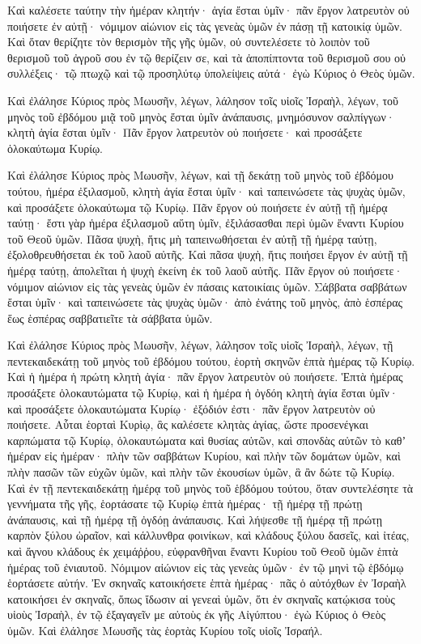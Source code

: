 {Καὶ καλέσετε ταύτην τὴν ἡμέραν κλητήν· ἁγία ἔσται ὑμῖν· πᾶν ἔργον λατρευτὸν οὐ ποιήσετε ἐν αὐτῇ· νόμιμον αἰώνιον εἰς τὰς γενεὰς ὑμῶν ἐν πάσῃ τῇ κατοικίᾳ ὑμῶν.
Καὶ ὅταν θερίζητε τὸν θερισμὸν τῆς γῆς ὑμῶν, οὐ συντελέσετε τὸ λοιπὸν τοῦ θερισμοῦ τοῦ ἀγροῦ σου ἐν τῷ θερίζειν σε, καὶ τὰ ἀποπίπτοντα τοῦ θερισμοῦ σου οὐ συλλέξεις· τῷ πτωχῷ καὶ τῷ προσηλύτῳ ὑπολείψεις αὐτά· ἐγὼ Κύριος ὁ Θεὸς ὑμῶν.
\par }{\PP {}Καὶ ἐλάλησε Κύριος πρὸς Μωυσῆν, λέγων,
λάλησον τοῖς υἱοῖς Ἰσραὴλ, λέγων, τοῦ μηνὸς τοῦ ἐβδόμου μιᾷ τοῦ μηνὸς ἔσται ὑμῖν ἀνάπαυσις, μνημόσυνον σαλπίγγων· κλητὴ ἁγία ἔσται ὑμῖν·
Πᾶν ἔργον λατρευτὸν οὐ ποιήσετε· καὶ προσάξετε ὁλοκαύτωμα Κυρίῳ.
\par }{\PP {}Καὶ ἐλάλησε Κύριος πρὸς Μωυσῆν, λέγων,
καὶ τῇ δεκάτῃ τοῦ μηνὸς τοῦ ἐβδόμου τούτου, ἡμέρα ἐξιλασμοῦ, κλητὴ ἁγία ἔσται ὑμῖν· καὶ ταπεινώσετε τὰς ψυχὰς ὑμῶν, καὶ προσάξετε ὁλοκαύτωμα τῷ Κυρίῳ.
Πᾶν ἔργον οὐ ποιήσετε ἐν αὐτῇ τῇ ἡμέρᾳ ταύτῃ· ἔστι γὰρ ἡμέρα ἐξιλασμοῦ αὕτη ὑμῖν, ἐξιλάσασθαι περὶ ὑμῶν ἔναντι Κυρίου τοῦ Θεοῦ ὑμῶν.
Πᾶσα ψυχὴ, ἥτις μὴ ταπεινωθήσεται ἐν αὐτῇ τῇ ἡμέρᾳ ταύτῃ, ἐξολοθρευθήσεται ἐκ τοῦ λαοῦ αὐτῆς.
Καὶ πᾶσα ψυχὴ, ἥτις ποιήσει ἔργον ἐν αὐτῇ τῇ ἡμέρᾳ ταύτῃ, ἀπολεῖται ἡ ψυχὴ ἐκείνη ἐκ τοῦ λαοῦ αὐτῆς.
Πᾶν ἔργον οὐ ποιήσετε· νόμιμον αἰώνιον εἰς τὰς γενεὰς ὑμῶν ἐν πάσαις κατοικίαις ὑμῶν.
Σάββατα σαββάτων ἔσται ὑμῖν· καὶ ταπεινώσετε τὰς ψυχὰς ὑμῶν· ἀπὸ ἐνάτης τοῦ μηνὸς, ἀπὸ ἑσπέρας ἕως ἑσπέρας σαββατιεῖτε τὰ σάββατα ὑμῶν.
\par }{\PP {}Καὶ ἐλάλησε Κύριος πρὸς Μωυσῆν, λέγων,
λάλησον τοῖς υἱοῖς Ἰσραὴλ, λέγων, τῇ πεντεκαιδεκάτῃ τοῦ μηνὸς τοῦ ἐβδόμου τούτου, ἑορτὴ σκηνῶν ἑπτὰ ἡμέρας τῷ Κυρίῳ.
Καὶ ἡ ἡμέρα ἡ πρώτη κλητὴ ἁγία· πᾶν ἔργον λατρευτὸν οὐ ποιήσετε.
Ἑπτὰ ἡμέρας προσάξετε ὁλοκαυτώματα τῷ Κυρίῳ, καὶ ἡ ἡμέρα ἡ ὀγδόη κλητὴ ἁγία ἔσται ὑμῖν· καὶ προσάξετε ὁλοκαυτώματα Κυρίῳ· ἐξόδιόν ἐστι· πᾶν ἔργον λατρευτὸν οὐ ποιήσετε.
Αὗται ἑορταὶ Κυρὶῳ, ἃς καλέσετε κλητὰς ἁγίας, ὥστε προσενέγκαι καρπώματα τῷ Κυρίῳ, ὁλοκαυτώματα καὶ θυσίας αὐτῶν, καὶ σπονδὰς αὐτῶν τὸ καθʼ ἡμέραν εἰς ἡμέραν·
πλὴν τῶν σαββάτων Κυρίου, καὶ πλὴν τῶν δομάτων ὑμῶν, καὶ πλὴν πασῶν τῶν εὐχῶν ὑμῶν, καὶ πλὴν τῶν ἐκουσίων ὑμῶν, ἃ ἂν δώτε τῷ Κυρίῳ.
Καὶ ἐν τῇ πεντεκαιδεκάτῃ ἡμέρᾳ τοῦ μηνὸς τοῦ ἑβδόμου τούτου, ὅταν συντελέσητε τὰ γεννήματα τῆς γῆς, ἑορτάσατε τῷ Κυρίῳ ἑπτὰ ἡμέρας· τῇ ἡμέρᾳ τῇ πρώτῃ ἀνάπαυσις, καὶ τῇ ἡμέρᾳ τῇ ὀγδόῃ ἀνάπαυσις.
Καὶ λήψεσθε τῇ ἡμέρᾳ τῇ πρώτῃ καρπὸν ξύλου ὡραῖον, καὶ κάλλυνθρα φοινίκων, καὶ κλάδους ξύλου δασεῖς, καὶ ἰτέας, καὶ ἄγνου κλάδους ἐκ χειμάῤῥου, εὐφρανθῆναι ἔναντι Κυρίου τοῦ Θεοῦ ὑμῶν ἑπτὰ ἡμέρας τοῦ ἐνιαυτοῦ.
Νόμιμον αἰώνιον εἰς τὰς γενεὰς ὑμῶν· ἐν τῷ μηνὶ τῷ ἑβδόμῳ ἑορτάσετε αὐτήν.
Ἐν σκηναῖς κατοικήσετε ἑπτὰ ἡμέρας· πᾶς ὁ αὐτόχθων ἐν Ἰσραὴλ κατοικήσει ἐν σκηναῖς,
ὅπως ἴδωσιν αἱ γενεαὶ ὑμῶν, ὅτι ἐν σκηναῖς κατῴκισα τοὺς υἱοὺς Ἰσραὴλ, ἐν τῷ ἐξαγαγεῖν με αὐτοὺς ἐκ γῆς Αἰγύπτου· ἐγὼ Κύριος ὁ Θεὸς ὑμῶν.
Καὶ ἐλάλησε Μωυσῆς τὰς ἑορτὰς Κυρίου τοῖς υἱοῖς Ἰσραήλ.

}
